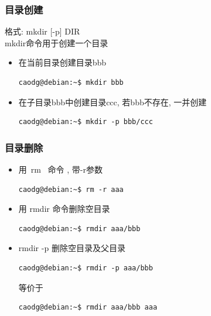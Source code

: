 \documentclass[compress]{beamer}
\begin{document}
\begin{frame}[containsverbatim]
\frametitle{目录创建}

格式: \alert{mkdir} [-p] DIR \\
\alert{mkdir}命令用于创建一个目录

\begin{itemize}
\item 在当前目录创建目录bbb\\
\begin{Verbatim}
caodg@debian:~$ mkdir bbb
\end{Verbatim}

\item 在子目录bbb中创建目录ccc, 若bbb不存在, 一并创建\\
\begin{Verbatim}
caodg@debian:~$ mkdir -p bbb/ccc
\end{Verbatim}

\end{itemize}


\end{frame}

\begin{frame}[containsverbatim]
  \frametitle{目录删除}
  \begin{itemize}
	\item 用\alert{~rm~} 命令 , 带\alert{-r}参数 \\
\begin{Verbatim}
caodg@debian:~$ rm -r aaa
\end{Verbatim}

\item 用 \alert{rmdir} 命令删除空目录 \\
\begin{Verbatim}
caodg@debian:~$ rmdir aaa/bbb
\end{Verbatim}

\item \alert{rmdir -p} 删除空目录及父目录 \\
\begin{Verbatim}
caodg@debian:~$ rmdir -p aaa/bbb
\end{Verbatim}
等价于 \\
\begin{Verbatim}
caodg@debian:~$ rmdir aaa/bbb aaa
\end{Verbatim}
\end{itemize}


\end{frame}
\end{document}
